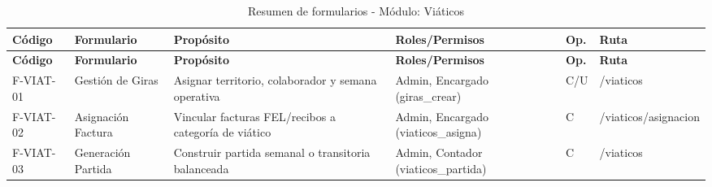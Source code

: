 {
\small
{}
\setlength{\parindent}{0pt}
\begin{xltabular}{\linewidth}{
    >{\raggedright\arraybackslash}p{1.8cm} 
    >{\raggedright\arraybackslash}p{2.8cm} 
    >{\raggedright\arraybackslash}X 
    >{\raggedright\arraybackslash}p{2.5cm} 
    >{\centering\arraybackslash}p{0.8cm} 
    >{\raggedright\arraybackslash}p{2.0cm}
}

    \caption{Resumen de formularios - Módulo: Viáticos} \label{tab:cap4_viaticos_resumen} \\
    \toprule
    \textbf{Código} & \textbf{Formulario} & \textbf{Propósito} & \textbf{Roles/Permisos} & \textbf{Op.} & \textbf{Ruta} \\
    \midrule
    \endfirsthead

    \toprule
    \textbf{Código} & \textbf{Formulario} & \textbf{Propósito} & \textbf{Roles/Permisos} & \textbf{Op.} & \textbf{Ruta} \\
    \midrule
    \endhead

    \endfoot

\bottomrule
\endlastfoot

    F-VIAT-01 & Gestión de Giras & Asignar territorio, colaborador y semana operativa & Admin, Encargado (\textrm{giras\_crear}) & C/U & \textrm{/viaticos} \\
    \addlinespace
    F-VIAT-02 & Asignación Factura & Vincular facturas FEL/recibos a categoría de viático & Admin, Encargado (\textrm{viaticos\_asigna}) & C & \textrm{/viaticos/asignacion} \\
    \addlinespace
    F-VIAT-03 & Generación Partida & Construir partida semanal o transitoria balanceada & Admin, Contador (\textrm{viaticos\_partida}) & C & \textrm{/viaticos} \\
\end{xltabular}
}

